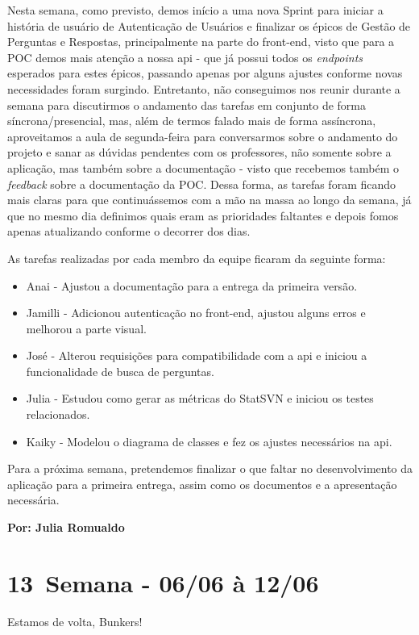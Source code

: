 Nesta semana, como previsto, demos início a uma nova \gls{Sprint} para iniciar a história de usuário de Autenticação de Usuários e finalizar os épicos de Gestão de Perguntas e Respostas, principalmente na parte do \gls{front-end}, visto que para a \gls{POC} demos mais atenção a nossa \acs{api} - que já possui todos os \textit{endpoints} esperados para estes épicos, passando apenas por alguns ajustes conforme novas necessidades foram surgindo. Entretanto, não conseguimos nos reunir durante a semana para discutirmos o andamento das tarefas em conjunto de forma síncrona/presencial, mas, além de termos falado mais de forma assíncrona, aproveitamos a aula de segunda-feira para conversarmos sobre o andamento do projeto e sanar as dúvidas pendentes com os professores, não somente sobre a aplicação, mas também sobre a documentação - visto que recebemos também o \textit{feedback} sobre a documentação da \acs{POC}. Dessa forma, as tarefas foram ficando mais claras para que continuássemos com a mão na massa ao longo da semana, já que no mesmo dia definimos quais eram as prioridades faltantes e depois fomos apenas atualizando conforme o decorrer dos dias.

As tarefas realizadas por cada membro da equipe ficaram da seguinte forma:
\begin{itemize}
    \item Anai - Ajustou a documentação para a entrega da primeira versão.
    \item Jamilli - Adicionou autenticação no \gls{front-end}, ajustou alguns erros e melhorou a parte visual.
    \item José - Alterou requisições para compatibilidade com a \acs{api} e iniciou a funcionalidade de busca de perguntas.
    \item Julia - Estudou como gerar as métricas do StatSVN e iniciou os testes relacionados.
    \item Kaiky - Modelou o diagrama de classes e fez os ajustes necessários na \acs{api}. 
\end{itemize}

\noindent Para a próxima semana, pretendemos finalizar o que faltar no desenvolvimento da aplicação para a primeira entrega, assim como os documentos e a apresentação necessária.

\textbf{Por: Julia Romualdo}

\section{13\textordfeminine \, Semana - 06/06 à 12/06}
Estamos de volta, Bunkers!

